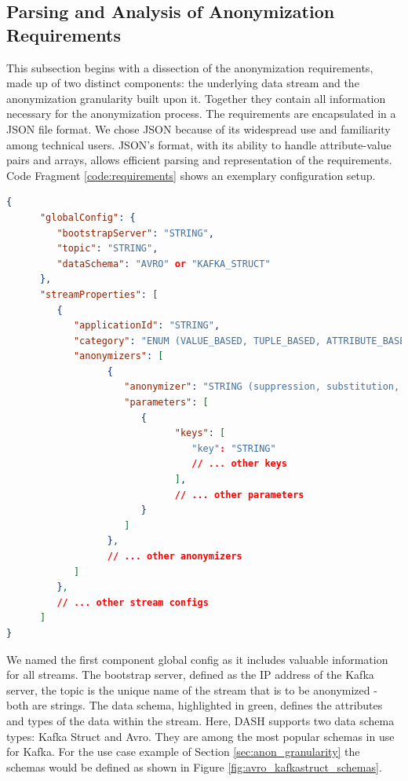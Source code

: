 \subsection{Parsing and Analysis of Anonymization Requirements}
This subsection begins with a dissection of the anonymization requirements, made up of two distinct components: the underlying data stream and the anony\-miza\-tion granularity built upon it. Together they contain all information necessary for the anonymization process. The requirements are encapsulated in a JSON file format. We chose JSON because of its widespread use and familiarity among technical users. JSON's format, with its ability to handle attribute-value pairs and arrays, allows efficient parsing and representation of the requirements. Code Fragment \ref{code:requirements} shows an exemplary configuration setup. 

\begin{lstlisting}[language=json, captionpos=b, caption={Example JSON Configuration for DASH. The \textit{globalConfig} specifies the underlying data stream. The \textit{Schema} refers to either an \textit{AVRO} or \textit{KAFKA\_STRUCT} data schema. Each entry in the \textit{streamProperties} defines an anonymized version of the original data consisting of a list of \textit{anonymizers}.}, breaklines=true, basicstyle=\ttfamily\footnotesize, frame=tb, label=code:requirements]
{
      "globalConfig": {
         "bootstrapServer": "STRING",
         "topic": "STRING",
         "dataSchema": "AVRO" or "KAFKA_STRUCT"
      },
      "streamProperties": [
         {
            "applicationId": "STRING",
            "category": "ENUM (VALUE_BASED, TUPLE_BASED, ATTRIBUTE_BASED, TABLE_BASED)",
            "anonymizers": [
                  {
                     "anonymizer": "STRING (suppression, substitution, etc.)",
                     "parameters": [
                        {
                              "keys": [
                                 "key": "STRING"
                                 // ... other keys
                              ],
                              // ... other parameters
                        }
                     ]
                  },
                  // ... other anonymizers
            ]
         },
         // ... other stream configs
      ]
}
\end{lstlisting}
   
We named the first component global config as it includes valuable information for all streams. The bootstrap server, defined as the IP address of the Kafka server, the topic is the unique name of the stream that is to be anonymized - both are strings. The data schema, highlighted in green, defines the attributes and types of the data within the stream. Here, \ac{DASH} supports two data schema types: Kafka Struct and Avro. They are among the most popular schemas in use for Kafka. For the use case example of Section \ref{sec:anon_granularity} the schemas would be defined as shown in Figure \ref{fig:avro_kafkastruct_schemas}. 

